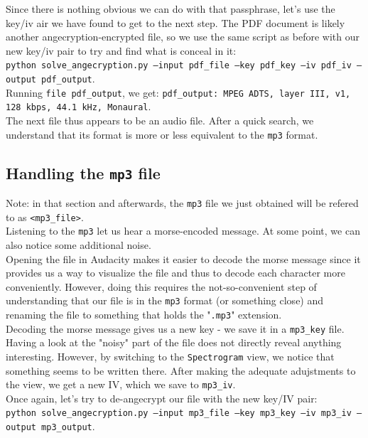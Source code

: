 \documentclass[12pt,a4paper]{article}
\begin{document}
    Since there is nothing obvious we can do with that passphrase, let's use
    the key/iv air we have found to get to the next step. The PDF document is
    likely another angecryption-encrypted file, so we use the same script as
    before with our new key/iv pair to try and find what is conceal in it:\\
    \texttt{python solve\_angecryption.py --input pdf\_file --key pdf\_key --iv
    pdf\_iv --output pdf\_output}.\\

    Running \texttt{file pdf\_output}, we get: \texttt{pdf\_output: MPEG ADTS,
    layer III, v1, 128 kbps, 44.1 kHz, Monaural}.\\
    The next file thus appears to be an audio file. After a quick search, we
    understand that its format is more or less equivalent to the \texttt{mp3} format.


    \subsection{Handling the \texttt{mp3} file}
    Note: in that section and afterwards, the \texttt{mp3} file we just
    obtained will be refered to as \texttt{<mp3\_file>}.\\

    Listening to the \texttt{mp3} let us hear a morse-encoded message. At some
    point, we can also notice some additional noise.\\
    Opening the file in Audacity makes it easier to decode the morse message
    since it provides us a way to visualize the file and thus to decode each
    character more conveniently. However, doing this requires the
    not-so-convenient step of understanding that our file is in the
    \texttt{mp3} format (or something close) and renaming the file to something
    that holds the "\texttt{.mp3}" extension.\\
    Decoding the morse message gives us a new key - we save it
    in a \texttt{mp3\_key} file.\\

    Having a look at the "noisy" part of the file does not directly reveal
    anything interesting. However, by switching to the \texttt{Spectrogram}
    view, we notice that something seems to be written there. After making the
    adequate adujstments to the view, we get a new IV, which we save to
    \texttt{mp3\_iv}.\\

    Once again, let's try to de-angecrypt our file with the new key/IV pair:\\
    \texttt{python solve\_angecryption.py --input mp3\_file --key mp3\_key --iv
    mp3\_iv --output mp3\_output}.
\end{document}
